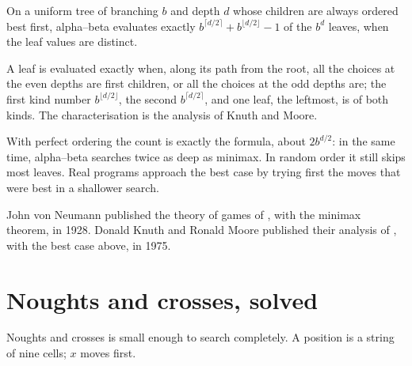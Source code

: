 \begin{proposition}\label{prop:b2:search-and-games:best-case}
On a uniform tree of branching $b$ and depth $d$ whose children are always ordered best first, alpha--beta evaluates
exactly $b^{\lceil d/2 \rceil} + b^{\lfloor d/2 \rfloor} - 1$ of the $b^d$ leaves, when the leaf values are distinct.
\end{proposition}

\admitted

A leaf is evaluated exactly when, along its path from the root, all the choices at the even depths are first children,
or all the choices at the odd depths are; the first kind number $b^{\lfloor d/2 \rfloor}$, the second $b^{\lceil d/2
\rceil}$, and one leaf, the leftmost, is of both kinds. The characterisation is the analysis of Knuth and Moore.

\label{out:b2:search-and-games:alphabeta}

With perfect ordering the count is exactly the formula, about $2b^{d/2}$: in the same time, alpha--beta searches twice as
deep as minimax. In random order it still skips most leaves. Real programs approach the best case by trying first the
moves that were best in a shallower search.

\begin{history}
John von Neumann published the theory of games of , with the minimax theorem, in 1928. Donald Knuth and Ronald
Moore published their analysis of , with the best case above, in 1975.
\end{history}

\section{Noughts and crosses, solved}\label{sec:b2:search-and-games:tictactoe}

Noughts and crosses is small enough to search completely. A position is a string of nine cells; $x$ moves first.

\label{lst:b2:search-and-games:tictactoe}

